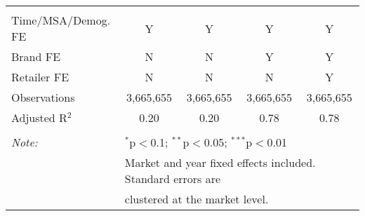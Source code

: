 \begin{table}[!htbp]
\begin{tabular}{@{\extracolsep{5pt}}lcccc}
 \hline \\[-1.8ex] 
Time/MSA/Demog. FE & Y & Y & Y & Y \\ 
Brand FE & N & N & Y & Y \\ 
Retailer FE & N & N & N & Y \\ 
Observations & 3,665,655 & 3,665,655 & 3,665,655 & 3,665,655 \\ 
Adjusted R$^{2}$ & 0.20 & 0.20 & 0.78 & 0.78 \\ 
\hline 
\hline \\[-1.8ex] 
\textit{Note:}  & \multicolumn{4}{l}{$^{*}$p$<$0.1; $^{**}$p$<$0.05; $^{***}$p$<$0.01} \\ 
 & \multicolumn{4}{l}{Market and year fixed effects included. Standard errors are } \\ 
 & \multicolumn{4}{l}{clustered at the market level.} \\ 
\end{tabular} 
\end{table} 
